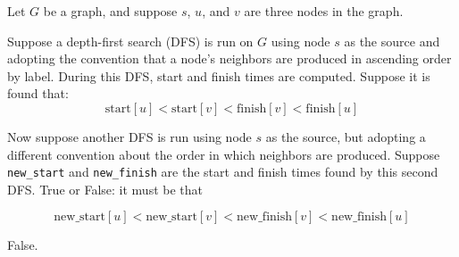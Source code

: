 \begin{prob}
    Let $G$ be a graph, and suppose $s$, $u$, and $v$ are three nodes in the graph.

    Suppose a depth-first search (DFS) is run on $G$ using node $s$ as the
    source and adopting the convention that a node's neighbors are produced in
    ascending order by label. During this DFS, start and finish times are
    computed. Suppose it is found that:
    \[
        \text{start}[u]
        <
        \text{start}[v]
        <
        \text{finish}[v]
        <
        \text{finish}[u]
    \]

    Now suppose another DFS is run using node $s$ as the source, but adopting a different
    convention about the order in which neighbors are produced. Suppose \texttt{new_start}
    and \texttt{new_finish} are the start and finish times found by this second DFS. True
    or False: it must be that

    \[
        \text{new_start}[u]
        <
        \text{new_start}[v]
        <
        \text{new_finish}[v]
        <
        \text{new_finish}[u]
    \]

    \tF

    \begin{soln}
        False.
    \end{soln}

\end{prob}
